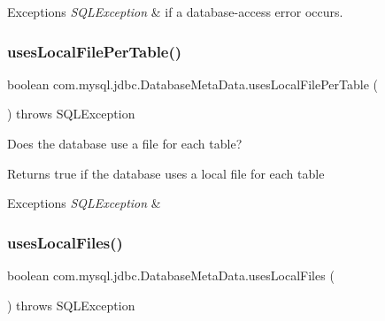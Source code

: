 \begin{DoxyExceptions}{Exceptions}
{\em S\+Q\+L\+Exception} & if a database-\/access error occurs. \\
\hline
\end{DoxyExceptions}
\mbox{\label{classcom_1_1mysql_1_1jdbc_1_1_database_meta_data_a2bf73a779c229a6101ae507f2af18f67}} 
\subsubsection{\texorpdfstring{uses\+Local\+File\+Per\+Table()}{usesLocalFilePerTable()}}
{\footnotesize\ttfamily boolean com.\+mysql.\+jdbc.\+Database\+Meta\+Data.\+uses\+Local\+File\+Per\+Table (\begin{DoxyParamCaption}{ }\end{DoxyParamCaption}) throws S\+Q\+L\+Exception}

Does the database use a file for each table?

\begin{DoxyReturn}{Returns}
true if the database uses a local file for each table 
\end{DoxyReturn}

\begin{DoxyExceptions}{Exceptions}
{\em S\+Q\+L\+Exception} & \\
\hline
\end{DoxyExceptions}
\mbox{\label{classcom_1_1mysql_1_1jdbc_1_1_database_meta_data_aa41bf75fed6b9c41ac793b9a06e6cad8}} 
\subsubsection{\texorpdfstring{uses\+Local\+Files()}{usesLocalFiles()}}
{\footnotesize\ttfamily boolean com.\+mysql.\+jdbc.\+Database\+Meta\+Data.\+uses\+Local\+Files (\begin{DoxyParamCaption}{ }\end{DoxyParamCaption}) throws S\+Q\+L\+Exception}

